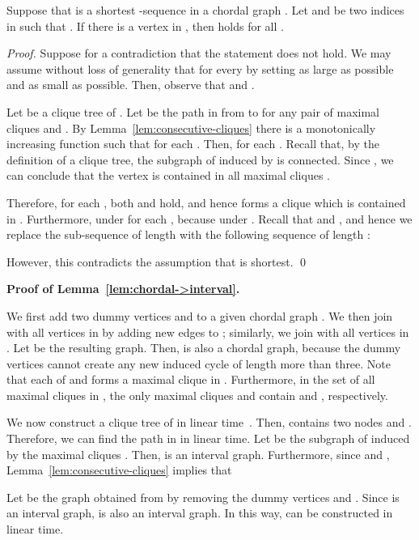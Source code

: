 \documentclass{llncs}
\newcounter{two}
\newcounter{three}
\begin{document}
	\begin{lemma} \label{lem:never-appear-again}
	Suppose that  is a shortest -sequence in a chordal graph .
	Let  and  be two indices in  such that .
	If there is a vertex  in , then  holds for all .
	\end{lemma}
	\begin{proof}
	Suppose for a contradiction that the statement does not hold.
	We may assume without loss of generality that  for every  by setting  as large as possible and  as small as possible.
	Then, observe that  and .

	Let  be a clique tree of .
	Let  be the path in  from  to  for any pair of maximal cliques  and .
	By Lemma~\ref{lem:consecutive-cliques} there is a monotonically increasing function  such that  for each .
	Then,  for each .
	Recall that, by the definition of a clique tree, the subgraph of  induced by  is connected.
	Since , we can conclude that the vertex  is contained in all maximal cliques .

	Therefore, for each , both  and  hold, and hence  forms a clique which is contained in .
	Furthermore,  under  for each , because  under .
	Recall that  and , and hence we replace the sub-sequence  of length  with the following sequence of length :
	
	However, this contradicts the assumption that  is shortest.
	\qed
\end{proof}
\medskip

\noindent
	{\bf Proof of Lemma~\ref{lem:chordal->interval}.}

We first add two dummy vertices  and  to a given chordal graph .
	We then join  with all vertices in  by adding new edges to ;
similarly, we join  with all vertices in .
	Let  be the resulting graph.
	Then,  is also a chordal graph, because the dummy vertices cannot create any new induced cycle of length more than three.
	Note that each of  and  forms a maximal clique in .
	Furthermore, in the set  of all maximal cliques in , the only maximal cliques  and  contain  and , respectively. 
	
	We now construct a clique tree  of  in linear time~\cite[\S 15.1]{Spinrad03}.
	Then,  contains two nodes  and .
	Therefore, we can find the path  in  in linear time.
	Let  be the subgraph of  induced by the maximal cliques .
	Then,  is an interval graph. 
	Furthermore, since  and , Lemma~\ref{lem:consecutive-cliques} implies that 
	
	Let  be the graph obtained from  by removing the dummy vertices  and .
	Since  is an interval graph,  is also an interval graph.
	In this way,  can be constructed in linear time. 
	
\end{document}
